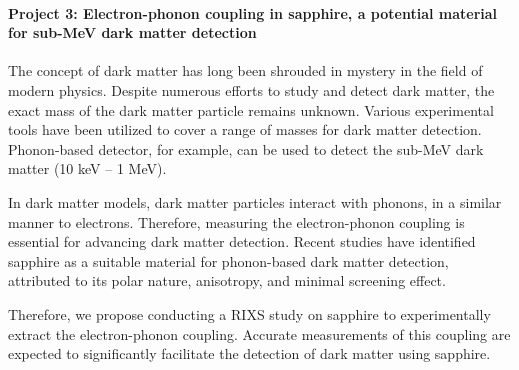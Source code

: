 \documentclass[11pt]{article}
\begin{document}
\paragraph{Project 3: Electron-phonon coupling in sapphire, a potential material for sub-MeV dark matter detection}
The concept of dark matter has long been shrouded in mystery in the field of modern physics. Despite numerous efforts to study and detect dark matter\cite{bergstrom_non-baryonic_2000,vogel_dark_2014,essig_first_2012,davidson_updated_2000}, the exact mass of the dark matter particle remains unknown. Various experimental tools have been utilized to cover a range of masses for dark matter detection. Phonon-based detector, for example, can be used to detect the sub-MeV dark matter (10 keV -- 1 MeV).
  
In dark matter models, dark matter particles interact with phonons, in a similar manner to electrons\cite{griffin_directional_2018}. Therefore, measuring the electron-phonon coupling is essential for advancing dark matter detection. Recent studies have identified sapphire as a suitable material for phonon-based dark matter detection, attributed to its polar nature, anisotropy, and minimal screening effect\cite{griffin_directional_2018}.
  
Therefore, we propose conducting a RIXS study on sapphire to experimentally extract the electron-phonon coupling. Accurate measurements of this coupling are expected to significantly facilitate the detection of dark matter using sapphire.
\end{document}
